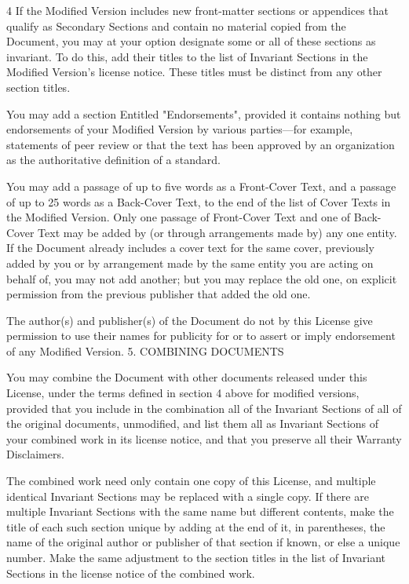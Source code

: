 \documentclass[fontsize=11pt,paper=A4,BCOR=12mm,DIV=13,open=any,listof=totoc,toc=flat]{scrbook}
\begin{document}
{\begin{multicols}{4}
If the Modified Version includes new front-matter sections or appendices that qualify as Secondary Sections and contain no material copied from the Document, you may at your option designate some or all of these sections as invariant. To do this, add their titles to the list of Invariant Sections in the Modified Version's license notice. These titles must be distinct from any other section titles.

You may add a section Entitled "Endorsements", provided it contains nothing but endorsements of your Modified Version by various parties—for example, statements of peer review or that the text has been approved by an organization as the authoritative definition of a standard.

You may add a passage of up to five words as a Front-Cover Text, and a passage of up to 25 words as a Back-Cover Text, to the end of the list of Cover Texts in the Modified Version. Only one passage of Front-Cover Text and one of Back-Cover Text may be added by (or through arrangements made by) any one entity. If the Document already includes a cover text for the same cover, previously added by you or by arrangement made by the same entity you are acting on behalf of, you may not add another; but you may replace the old one, on explicit permission from the previous publisher that added the old one.

The author(s) and publisher(s) of the Document do not by this License give permission to use their names for publicity for or to assert or imply endorsement of any Modified Version.
5. COMBINING DOCUMENTS

You may combine the Document with other documents released under this License, under the terms defined in section 4 above for modified versions, provided that you include in the combination all of the Invariant Sections of all of the original documents, unmodified, and list them all as Invariant Sections of your combined work in its license notice, and that you preserve all their Warranty Disclaimers.

The combined work need only contain one copy of this License, and multiple identical Invariant Sections may be replaced with a single copy. If there are multiple Invariant Sections with the same name but different contents, make the title of each such section unique by adding at the end of it, in parentheses, the name of the original author or publisher of that section if known, or else a unique number. Make the same adjustment to the section titles in the list of Invariant Sections in the license notice of the combined work.


\end{multicols}}
\end{document}
